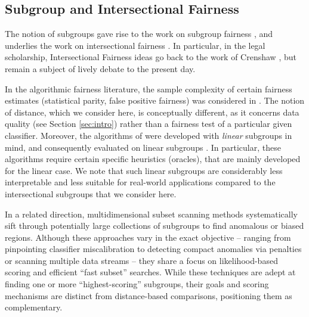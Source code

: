 
\subsection{Subgroup and Intersectional Fairness}

The notion of subgroups gave rise to the
 work on subgroup fairness \cite{kearns2018preventing}, and underlies the work on intersectional fairness \cite{foulds2020intersectional,gohar2023survey}.
In particular, in the legal scholarship, Intersectional Fairness ideas go back to the work of
Crenshaw \cite{crenshaw2013demarginalizing}, but remain a subject of lively debate \cite{collins2020intersectionality} to the present day.

In the algorithmic fairness literature,
the sample complexity of certain fairness estimates (statistical parity, false positive fairness) was considered in \cite{kearns2018preventing}. The notion of distance, which we consider here, is conceptually different, as it concerns data quality (see Section \ref{sec:intro}) rather than a fairness test of a particular given classifier. Moreover,
the algorithms of \cite{kearns2018preventing} were developed with \emph{linear} subgroups in mind, and consequently evaluated on linear subgroups \cite{kearns2019empirical}.
In particular, these algorithms require certain specific heuristics (oracles), that are mainly developed for the linear case.
We note that such linear subgroups are considerably less interpretable and less suitable for real-world applications compared to the intersectional subgroups that we consider here.


In a related direction, multidimensional subset scanning methods systematically sift through potentially large collections of subgroups to find anomalous or biased regions. Although these approaches vary in the exact objective -- ranging from pinpointing classifier miscalibration \cite{zhang2016identifying} to detecting compact anomalies via penalties \cite{speakman2015penalized} or scanning multiple data streams \cite{neil2013fast} -- they share a focus on likelihood-based scoring and efficient “fast subset” searches. While these techniques are adept at finding one or more ``highest-scoring'' subgroups, their goals and scoring mechanisms are distinct from distance-based comparisons, positioning them as complementary.


%